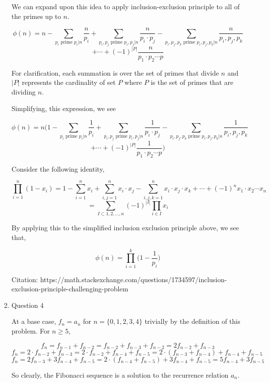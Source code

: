 \documentclass[12pt]{exam}
\begin{document}
\begin{enumerate}
We can expand upon this idea to apply inclusion-exclusion principle to all of the primes up to $n$. 

$$
\phi(n) = n - \sum_{p_i \text{ prime } p_i|n} \frac{n}{p_i} + \sum_{p_i, p_j \text{ prime } p_i, p_j | n} \frac{n}{p_i\cdot p_j} - \sum_{p_i,p_j, p_k \text{ prime } p_i, p_j, p_k | n} \frac{n}{p_i, p_j, p_k} $$ $$ + \cdots + (-1)^{|P|} \frac{n}{p_1\cdot p_2 \cdots p}
$$

For clarification, each summation is over the set of primes that divide $n$ and $|P|$ represents the cardinality of set $P$ where $P$ is the set of primes that are dividing $n$.

Simplifying, this expression, we see

$$
\phi(n) = n\Bigg (1 - \sum_{p_i \text{ prime } p_i|n} \frac{1}{p_i} + \sum_{p_i, p_j \text{ prime } p_i, p_j | n} \frac{1}{p_i\cdot p_j} - \sum_{p_i,p_j, p_k \text{ prime } p_i, p_j, p_k | n} \frac{1}{p_i, p_j, p_k} $$ $$ + \cdots + (-1)^{|P|} \frac{1}{p_1\cdot p_2 \cdots p} \Bigg)
$$

Consider the following identity, 

$$
\prod_{i = 1}^{n} (1 - x_i) = 1 - \sum_{i = 1}^{n} x_i + \sum_{i, j = 1}^{n} x_i\cdot x_j - \sum_{i, j, k = 1}^n x_i \cdot x_j \cdot x_k + \cdots + (-1)^n x_1\cdot x_2\cdots x_n
$$
$$
= \sum_{I \subset 1, 2, \dots, n} (-1)^{|I|} \prod_{i \in I} x_i
$$

By applying this to the simplified inclusion exclusion principle above, we see that, 

$$
\phi(n) = \prod_{i = 1}^{k} \Big ( 1 - \frac{1}{p_i} \Big )
$$


Citation: https://math.stackexchange.com/questions/1734597/inclusion-exclusion-principle-challenging-problem

\newpage

\item Question 4

At a base case, $f_n = a_n$ for $n = \{0, 1, 2, 3, 4\}$ trivially by the definition of this problem. For $n \ge 5$, 

$$
f_n = f_{n - 1} + f_{n - 2} = f_{n - 2} + f_{n - 3} + f_{n - 2} = 2f_{n - 2} + f_{n - 3}
$$
$$
f_{n} = 2\cdot f_{n - 2} + f_{n - 3} = 2\cdot f_{n - 2} + f_{n - 4} + f_{n - 5} = 2\cdot (f_{n - 3} + f_{n - 4}) + f_{n - 4} + f_{n - 5}
$$
$$
f_{n} = 2f_{n - 3} + 3f_{n - 4} + f_{n - 5} = 2\cdot (f_{n - 4} + f_{n - 5}) + 3f_{n - 4} + f_{n - 5} = 5f_{n - 4} + 3f_{n - 5}
$$

So clearly, the Fibonacci sequence is a solution to the recurrence relation $a_n$. 


\end{enumerate}
\end{document}
